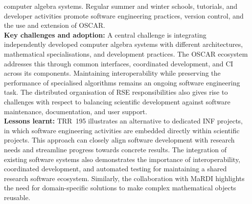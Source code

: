 \documentclass{eceasst}
\begin{document}
computer algebra systems.
Regular summer and winter schools, tutorials, and developer activities promote software engineering
practices, version control, and the use and extension of OSCAR.
\\
\noindent\textbf{Key challenges and adoption:}
A central challenge is integrating independently
developed computer algebra systems with different
architectures, mathematical specialisations, and
development practices. The OSCAR ecosystem addresses
this through common interfaces, coordinated development,
and CI across its components.
Maintaining interoperability while preserving the
performance of specialised algorithms remains an
ongoing software engineering task.
The distributed organisation of RSE responsibilities also gives rise to challenges with respect to
balancing scientific development against software maintenance, documentation, and user support.
\\
\noindent\textbf{Lessons learnt:}
TRR~195 illustrates an alternative to dedicated INF projects, in which software engineering
activities are embedded directly within scientific projects. This approach can closely align
software development with research needs and streamline progress towards concrete results.
The integration of existing software systems also demonstrates the importance of interoperability,
coordinated development, and automated testing for maintaining a shared research software ecosystem.
Similarly, the collaboration with MaRDI highlights the need for domain-specific solutions to make
complex mathematical objects reusable.


\end{document}
